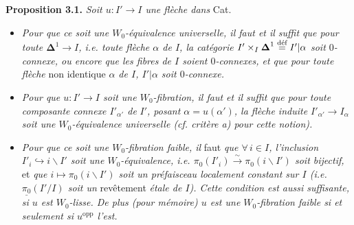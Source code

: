 \noindent\textbf{Proposition 3.1.} \textit{Soit $u : I' \longrightarrow I$ une flèche dans} Cat.
\begin{itemize}
\item[\textit{a)}] \textit{Pour que ce soit une $W_0$-équivalence universelle, il faut et il suffit que pour toute $\boldsymbol{\Delta}^1 \longrightarrow I$, i.e. toute flèche $\alpha$ de $I$, la catégorie $I' \times_I \boldsymbol{\Delta}^1 \defeq I'|\alpha$ soit $0$-connexe, ou encore que les fibres de $I$ soient $0$-connexes, et que pour toute flèche} non identique \textit{$\alpha$ de $I$, $I'|\alpha$ soit $0$-connexe.}
\item[\textit{b)}] \textit{Pour que $u : I' \longrightarrow I$ soit une $W_0$-fibration, il faut et il suffit que pour toute composante connexe $I'_{\alpha'}$ de}
\textit{$I'$, posant $\alpha = u(\alpha')$, la flèche induite $I'_{\alpha'} \longrightarrow I_\alpha$ soit une $W_0$-équivalence universelle (cf. critère a) pour cette notion).}
\item[\textit{c)}] \textit{Pour que ce soit une $W_0$-fibration faible, il} faut \textit{que $\forall\, i \in I$, l'inclusion $I'_i \hookrightarrow i\backslash I'$ soit une $W_0$-équivalence, i.e. $\pi_0(I'_i) \xrightarrow{\;\sim\;} \pi_0(i\backslash I')$ soit bijectif,} et \textit{que $i \longmapsto \pi_0(i\backslash I')$ soit un préfaisceau localement constant sur $I$ (i.e. $\underline{\pi_0}(I'/I)$ soit un} revêtement \textit{étale de $I$). Cette condition est aussi suffisante, si $u$ est $W_0$-lisse. De plus (pour mémoire) $u$ est une $W_0$-fibration faible si et seulement si $u^{\mathrm{opp}}$ l'est.}
\end{itemize}

